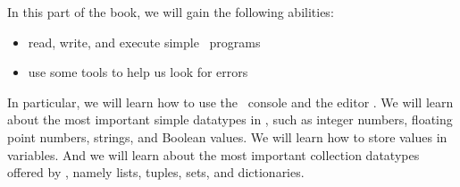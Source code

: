 %
%
In this part of the book, we will gain the following abilities:%
%
\begin{itemize}%
\item read, write, and execute simple \python\ programs%
\item use some tools to help us look for errors%
\end{itemize}%
%
In particular, we will learn how to use the \python\ console and the editor \pycharm.
We will learn about the most important simple datatypes in \python, such as integer numbers, floating point numbers, strings, and Boolean values.
We will learn how to store values in variables.
And we will learn about the most important collection datatypes offered by \python, namely lists, tuples, sets, and dictionaries.%
%
%
%
%
%
\endhsection%
%
